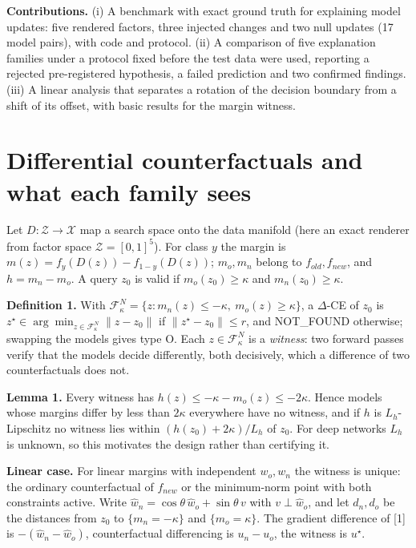 \documentclass{esannV2}
\begin{document}
\textbf{Contributions.} (i) A benchmark with exact ground truth for explaining model updates: five rendered factors, three injected changes and two null updates (17 model pairs), with code and protocol. (ii) A comparison of five explanation families under a protocol fixed before the test data were used, reporting a rejected pre-registered hypothesis, a failed prediction and two confirmed findings. (iii) A linear analysis that separates a rotation of the decision boundary from a shift of its offset, with basic results for the margin witness.

\section{Differential counterfactuals and what each family sees}

Let $D:\mathcal Z\to\mathcal X$ map a search space onto the data manifold (here an exact renderer from factor space $\mathcal Z=[0,1]^5$). For class $y$ the margin is $m(z)=f_y(D(z))-f_{1-y}(D(z))$; $m_o,m_n$ belong to $f_{old},f_{new}$, and $h=m_n-m_o$. A query $z_0$ is valid if $m_o(z_0)\ge\kappa$ and $m_n(z_0)\ge\kappa$.

\textbf{Definition 1.} With $\mathcal F^N_\kappa=\{z: m_n(z)\le-\kappa,\ m_o(z)\ge\kappa\}$, a $\Delta$-CE of $z_0$ is $z^\star\in\arg\min_{z\in\mathcal F^N_\kappa}\|z-z_0\|$ if $\|z^\star-z_0\|\le r$, and NOT\_FOUND otherwise; swapping the models gives type O. Each $z\in\mathcal F^N_\kappa$ is a \emph{witness}: two forward passes verify that the models decide differently, both decisively, which a difference of two counterfactuals does not.

\textbf{Lemma 1.} Every witness has $h(z)\le-\kappa-m_o(z)\le-2\kappa$. Hence models whose margins differ by less than $2\kappa$ everywhere have no witness, and if $h$ is $L_h$-Lipschitz no witness lies within $(h(z_0)+2\kappa)/L_h$ of $z_0$. For deep networks $L_h$ is unknown, so this motivates the design rather than certifying it.

\textbf{Linear case.} For linear margins with independent $w_o,w_n$ the witness is unique: the ordinary counterfactual of $f_{new}$ or the minimum-norm point with both constraints active. Write $\hat w_n=\cos\theta\,\hat w_o+\sin\theta\,v$ with $v\perp\hat w_o$, and let $d_n,d_o$ be the distances from $z_0$ to $\{m_n=-\kappa\}$ and $\{m_o=\kappa\}$. The gradient difference of [1] is $-(\hat w_n-\hat w_o)$, counterfactual differencing is $u_n-u_o$, the witness is $u^\star$.
\end{document}
